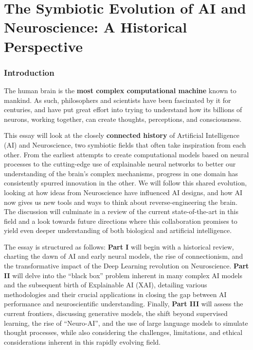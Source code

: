 \part{The Symbiotic Evolution of AI and Neuroscience: A Historical Perspective}

\section{Introduction}

The human brain is the \textbf{most complex computational machine} known to mankind. As such, philosophers and scientists have been fascinated by it for centuries, and have put great effort into trying to understand how its billions of neurons, working together, can create thoughts, perceptions, and consciousness.

This essay will look at the closely \textbf{connected history} of Artificial Intelligence (AI) and Neuroscience, two symbiotic fields that often take inspiration from each other. From the earliest attempts to create computational models based on neural processes to the cutting-edge use of explainable neural networks to better our understanding of the brain's complex mechanisms, progress in one domain has consistently spurred innovation in the other. We will follow this shared evolution, looking at how ideas from Neuroscience have influenced AI designs, and how AI now gives us new tools and ways to think about reverse-engineering the brain. The discussion will culminate in a review of the current state-of-the-art in this field and a look towards future directions where this collaboration promises to yield even deeper understanding of both biological and artificial intelligence.

The essay is structured as follows: \textbf{Part I} will begin with a historical review, charting the dawn of AI and early neural models, the rise of connectionism, and the transformative impact of the Deep Learning revolution on Neuroscience. \textbf{Part II} will delve into the ``black box'' problem inherent in many complex AI models and the subsequent birth of Explainable AI (XAI), detailing various methodologies and their crucial applications in closing the gap between AI performance and neuroscientific understanding. Finally, \textbf{Part III} will assess the current frontiers, discussing generative models, the shift beyond supervised learning, the rise of ``Neuro-AI'', and the use of large language models to simulate thought processes, while also considering the challenges, limitations, and ethical considerations inherent in this rapidly evolving field.

